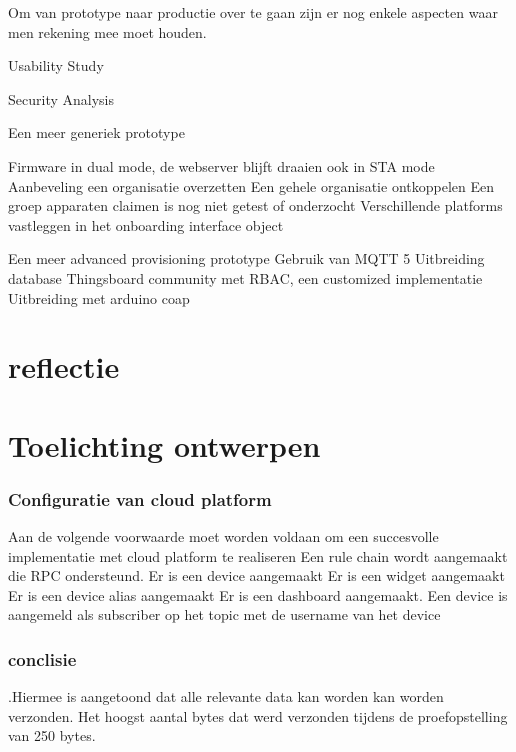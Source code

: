 		Om van prototype naar productie over te gaan zijn er nog enkele aspecten waar men rekening mee moet houden.
		
		Usability Study 
		
		
		Security Analysis 
		
		Een meer generiek prototype
		
		
		Firmware in dual mode, de webserver blijft draaien ook in STA mode
		Aanbeveling een organisatie overzetten 
		Een gehele organisatie ontkoppelen 
		Een groep apparaten claimen is nog niet getest of onderzocht
		Verschillende platforms vastleggen in het onboarding interface object
		
		Een meer advanced provisioning prototype 
		Gebruik van MQTT 5 
		Uitbreiding database Thingsboard community met RBAC, een customized implementatie
		Uitbreiding met arduino coap
		
		
		
		
		\begin{center}
		\end{center}
		\chapter{reflectie}
		
		
		
		\chapter{Toelichting ontwerpen}
		
		
		
		\subsection{Configuratie van cloud platform}
		Aan de volgende voorwaarde moet worden voldaan om een succesvolle implementatie met cloud platform te realiseren
		Een rule chain wordt aangemaakt die RPC ondersteund.
		Er is een device aangemaakt
		Er is een widget aangemaakt
		Er is een device alias aangemaakt
		Er is een dashboard aangemaakt.
		Een device is aangemeld als subscriber op het topic met de username van het device
		
	 
		
	 
		
		\subsection{conclisie}
		.Hiermee is aangetoond dat alle relevante data kan worden kan worden verzonden. Het hoogst aantal bytes dat werd verzonden tijdens de proefopstelling van 250 bytes.
		 
